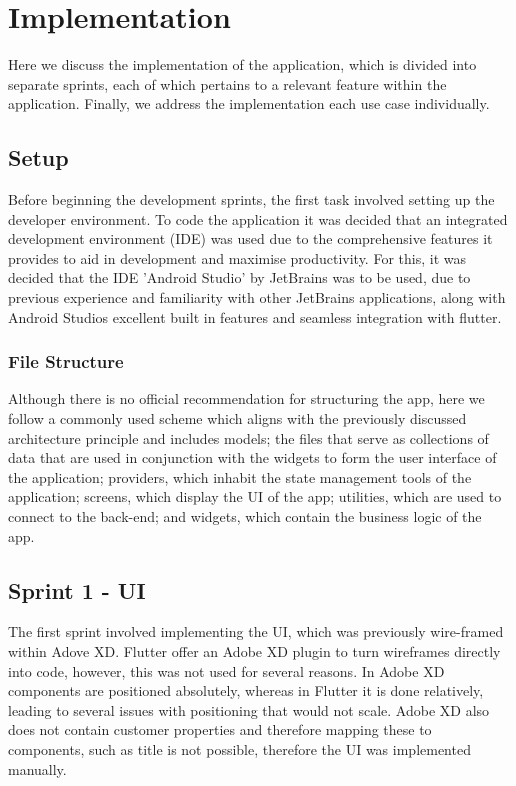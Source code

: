 \documentclass[12pt]{article}
\begin{document}
	\section{Implementation}
	Here we discuss the implementation of the application, which is divided into separate sprints, each of which pertains to a relevant feature within the application. Finally, we address the implementation each use case individually.
	
	\label{chap:implementation}
	\subsection{Setup}
	Before beginning the development sprints, the first task involved setting up the developer environment. To code the application it was decided that an integrated development environment (IDE) was used due to the comprehensive features it provides to aid in development and maximise productivity. For this, it was decided that the IDE 'Android Studio' by JetBrains \cite{DownloadAndroidStudio} was to be used, due to previous experience and familiarity with other JetBrains applications, along with Android Studios excellent built in features and seamless integration with flutter. 


	\subsubsection{File Structure}
	Although there is no official recommendation for structuring the app, here we follow a commonly used scheme which aligns with the previously discussed architecture principle and includes models; the files that serve as collections of data that are used in conjunction with the widgets to form the user interface of the application; providers, which inhabit the state management tools of the application; screens, which display the UI of the app; utilities, which are used to connect to the back-end; and widgets, which contain the business logic of the app.
	
	
	
	\subsection{Sprint 1 - UI}
	The first sprint involved implementing the UI, which was previously wire-framed within Adove XD. Flutter offer an Adobe XD plugin to turn wireframes directly into code, however, this was not used for several reasons. In Adobe XD components are positioned absolutely, whereas in Flutter it is done relatively, leading to several issues with positioning that would not scale. Adobe XD also does not contain customer properties and therefore mapping these to components, such as title is not possible, therefore the UI was implemented manually.
	
\end{document}

